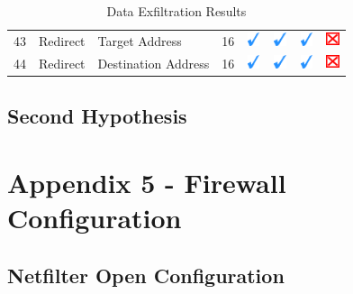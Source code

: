 \documentclass[12pt]{article}
\begin{document}
\begin{savenotes}
\begin{table}[!htpb]
{\begin{tabular}{|C{1.0cm}|L{5.0cm}|L{5.0cm}|C{2.0cm}|C{1.0cm}|C{1.0cm}|C{1.0cm}|C{1.0cm}|}
43&Redirect&Target Address&16&\includegraphics[width=4mm, height=4mm]{ok}&\includegraphics[width=4mm, height=4mm]{ok}&\includegraphics[width=4mm, height=4mm]{ok}&\includegraphics[width=4mm, height=4mm]{notok}\\
44&Redirect&Destination Address&16&\includegraphics[width=4mm, height=4mm]{ok}&\includegraphics[width=4mm, height=4mm]{ok}&\includegraphics[width=4mm, height=4mm]{ok}&\includegraphics[width=4mm, height=4mm]{notok}\\
\hline
\end{tabular}}
\caption{Data Exfiltration Results}
\label{table:exfiltrationResults2}
\end{table}
\end{savenotes}

\clearpage

\subsection{Second Hypothesis}
\label{appendix:resultsSecond}

\clearpage

\pagebreak

\section{Appendix 5 - Firewall Configuration}
\label{Appendix 5}

\subsection{Netfilter Open Configuration}
\label{appendix:netfilterOpenApp}
\end{document}
